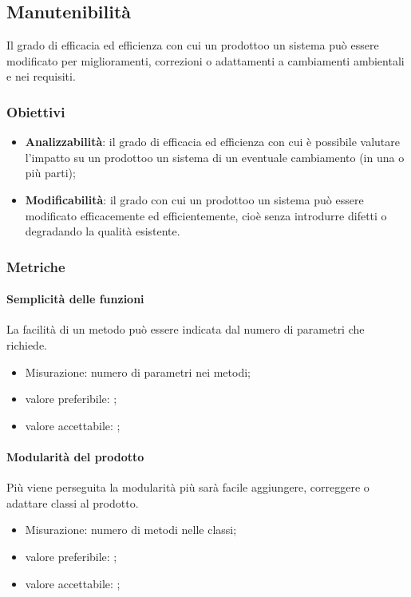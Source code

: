     \subsection{Manutenibilità}
        Il grado di efficacia ed efficienza con cui un prodotto\glosp o un sistema può essere modificato per miglioramenti, correzioni o adattamenti a cambiamenti ambientali e nei requisiti.
        \subsubsection{Obiettivi}
        \begin{itemize}
            \item \textbf{Analizzabilità}: il grado di efficacia ed efficienza con cui è possibile valutare l'impatto su un prodotto\glosp o un sistema di un eventuale cambiamento (in una o più parti);
            \item \textbf{Modificabilità}: il grado con cui un prodotto\glosp o un sistema può essere modificato efficacemente ed efficientemente, cioè senza introdurre difetti o degradando la qualità esistente.
        \end{itemize}
        \subsubsection{Metriche}
            \paragraph{Semplicità delle funzioni}
                La facilità di un metodo può essere indicata dal numero di parametri che richiede.
                \begin{itemize}
                    \item Misurazione: numero di parametri nei metodi;
                    \item valore preferibile: ;
                    \item valore accettabile: ;
                \end{itemize}
            \paragraph{Modularità del prodotto}
                Più viene perseguita la modularità più sarà facile aggiungere, correggere o adattare classi al prodotto\glo.
                \begin{itemize}
                    \item Misurazione: numero di metodi nelle classi;
                    \item valore preferibile: ;
                    \item valore accettabile: ;
                \end{itemize}
